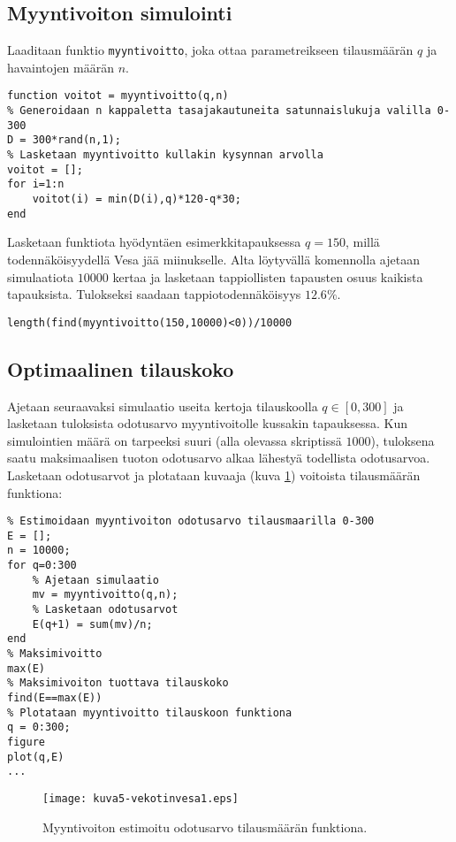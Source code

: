 \documentclass[a4paper,11pt]{article}
\begin{document}
{\subsection{Myyntivoiton simulointi}

Laaditaan funktio \texttt{myyntivoitto}, joka ottaa parametreikseen tilausmäärän $q$ ja havaintojen määrän $n$.

\begin{lstlisting}
function voitot = myyntivoitto(q,n)
% Generoidaan n kappaletta tasajakautuneita satunnaislukuja valilla 0-300
D = 300*rand(n,1);
% Lasketaan myyntivoitto kullakin kysynnan arvolla
voitot = [];
for i=1:n
    voitot(i) = min(D(i),q)*120-q*30;
end
\end{lstlisting}

Lasketaan funktiota hyödyntäen esimerkkitapauksessa $q=150$, millä todennäköisyydellä Vesa jää miinukselle. Alta löytyvällä komennolla ajetaan simulaatiota $10000$ kertaa ja lasketaan tappiollisten tapausten osuus kaikista tapauksista. Tulokseksi saadaan tappiotodennäköisyys $12.6\%$.

\texttt{length(find(myyntivoitto(150,10000)<0))/10000}

\subsection{Optimaalinen tilauskoko}

Ajetaan seuraavaksi simulaatio useita kertoja tilauskoolla $q\in[0,300]$ ja lasketaan tuloksista odotusarvo myyntivoitolle kussakin tapauksessa. Kun simulointien määrä on tarpeeksi suuri (alla olevassa skriptissä $1000$), tuloksena saatu maksimaalisen tuoton odotusarvo alkaa lähestyä todellista odotusarvoa. Lasketaan odotusarvot ja plotataan kuvaaja (kuva \ref{fig:vesavesavesa}) voitoista tilausmäärän funktiona:

\begin{lstlisting}
% Estimoidaan myyntivoiton odotusarvo tilausmaarilla 0-300
E = [];
n = 10000;
for q=0:300
    % Ajetaan simulaatio
    mv = myyntivoitto(q,n);
    % Lasketaan odotusarvot
    E(q+1) = sum(mv)/n;
end
% Maksimivoitto
max(E)
% Maksimivoiton tuottava tilauskoko
find(E==max(E))
% Plotataan myyntivoitto tilauskoon funktiona
q = 0:300;
figure
plot(q,E)
...
\end{lstlisting}

\begin{figure}
    \centering
    \texttt{[image: kuva5-vekotinvesa1.eps]}
    \caption{Myyntivoiton estimoitu odotusarvo tilausmäärän funktiona.}
    \label{fig:vesavesavesa}
\end{figure}

}
\end{document}
